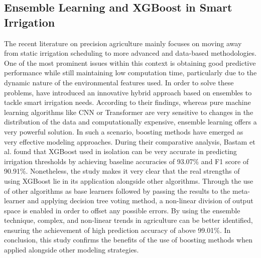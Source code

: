 \documentclass[conference]{IEEEtran}
\begin{document}
\subsection{Ensemble Learning and XGBoost in Smart Irrigation}
The recent literature on precision agriculture mainly focuses on moving away from static irrigation scheduling to more advanced and data-based methodologies. One of the most prominent issues within this context is obtaining good predictive performance while still maintaining low computation time, particularly due to the dynamic nature of the environmental features used\cite{inbook}. In order to solve these problems,  have introduced an innovative hybrid approach based on ensembles to tackle smart irrigation needs. According to their findings, whereas pure machine learning algorithms like CNN or Transformer are very sensitive to changes in the distribution of the data and computationally expensive, ensemble learning offers a very powerful solution\cite{ensemble}.
In such a scenario, boosting methods have emerged as very effective modeling approaches. During their comparative analysis, Bastam et al. found that XGBoost used in isolation can be very accurate in predicting irrigation thresholds by achieving baseline accuracies of 93.07\% and F1 score of 90.91\%. Nonetheless, the study makes it very clear that the real strengths of using XGBoost lie in its application alongside other algorithms. Through the use of other algorithms as base learners followed by passing the results to the meta-learner and applying decision tree voting method, a non-linear division of output space is enabled in order to offset any possible errors. By using the ensemble technique, complex, and non-linear trends in agriculture can be better identified, ensuring the achievement of high prediction accuracy of above 99.01\%. In conclusion, this study confirms the benefits of the use of boosting methods when applied alongside other modeling strategies\cite{ensemble}.
\end{document}
